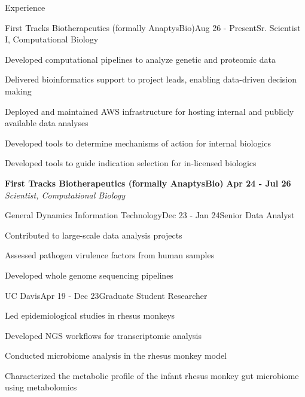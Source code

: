 \documentclass{resume} %
\begin{document}
\begin{rSection}{Experience}

\begin{rSubsection}{First Tracks Biotherapeutics (formally AnaptysBio)}{Aug 26 - Present}{Sr. Scientist I, Computational Biology}{}

\item Developed computational pipelines to analyze genetic and proteomic data
\item Delivered bioinformatics support to project leads, enabling data-driven decision making
\item Deployed and maintained AWS infrastructure for hosting internal and publicly available data analyses
\item Developed tools to determine mechanisms of action for internal biologics
\item Developed tools to guide indication selection for in-licensed biologics

\end{rSubsection}

{\bf First Tracks Biotherapeutics (formally AnaptysBio)} \hfill {\bf Apr 24 - Jul 26}\\
{\em Scientist, Computational Biology}
\vspace{0.5em}

\begin{rSubsection}{General Dynamics Information Technology}{Dec 23 - Jan 24}{Senior Data Analyst}{}

\item Contributed to large-scale data analysis projects
\item Assessed pathogen virulence factors from human samples
\item Developed whole genome sequencing pipelines

\end{rSubsection}


\begin{rSubsection}{UC Davis}{Apr 19 - Dec 23}{Graduate Student Researcher}{}

\item Led epidemiological studies in rhesus monkeys
\item Developed NGS workflows for transcriptomic analysis
\item Conducted microbiome analysis in the rhesus monkey model
\item Characterized the metabolic profile of the infant rhesus monkey gut microbiome using metabolomics

\end{rSubsection}
\end{rSection}
\end{document}
